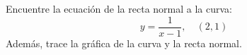 \item Encuentre la ecuación de la recta normal a la curva:
$$y = \frac{1}{x - 1}, \quad (2, 1)$$
Además, trace la gráfica de la curva y la recta normal.
